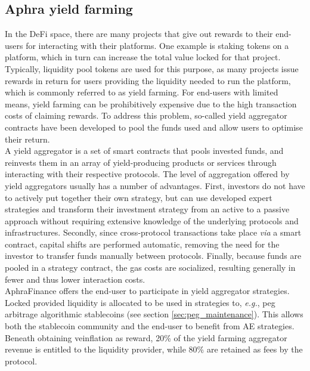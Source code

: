 \subsection{Aphra yield farming}
\label{subsec:aphra-yield-farming}
In the DeFi space, there are many projects that give out rewards to their end-users for interacting with their platforms.
One example is staking tokens on a platform, which in turn can increase the total value locked for that project.
Typically, liquidity pool tokens are used for this purpose, as many projects issue rewards in return for users providing the liquidity needed to run the platform, which is commonly referred to as yield farming.
For end-users with limited means, yield farming can be prohibitively expensive due to the high transaction costs of claiming rewards. 
To address this problem, so-called yield aggregator contracts have been developed to pool the funds used and allow users to optimise their return.\cite{cousaert2021}\\[-1em]

A yield aggregator is a set of smart contracts that pools invested funds, and reinvests them in an array of yield-producing products or services through interacting with their respective protocols. 
The level of aggregation offered by yield aggregators usually has a number of advantages. 
First, investors do not have to actively put together their own strategy, but can use developed expert strategies and transform their investment strategy from an active to a passive approach without requiring extensive knowledge of the underlying protocols and infrastructures.
Secondly, since cross-protocol transactions take place \textit{via} a smart contract, capital shifts are performed automatic, removing the need for the investor to transfer funds manually between protocols.
Finally, because funds are pooled in a strategy contract, the gas costs are socialized, resulting generally in fewer and thus lower interaction costs.\\[-1em]

AphraFinance offers the end-user to participate in yield aggregator strategies. 
Locked provided liquidity is allocated to be used in strategies to, \textit{e.g.}, peg arbitrage algorithmic stablecoins (see section \ref{sec:peg_maintenance}).
This allows both the stablecoin community and the end-user to benefit from AE strategies.
Beneath obtaining ve\aphra inflation as reward, 20\% of the yield farming aggregator revenue is entitled to the liquidity provider, while 80\% are retained as fees by the protocol.

